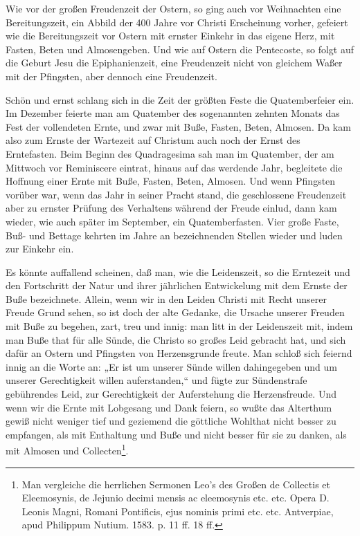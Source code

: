 Wie vor der großen Freudenzeit der Ostern, so ging auch vor Weihnachten eine Bereitungszeit, ein Abbild der 400 Jahre vor Christi Erscheinung vorher, gefeiert wie die Bereitungszeit vor Ostern mit ernster Einkehr in das eigene Herz, mit Fasten, Beten und Almosengeben. Und wie auf Ostern die Pentecoste, so folgt auf die Geburt Jesu die Epiphanienzeit, eine Freudenzeit nicht von gleichem Waßer mit der Pfingsten, aber dennoch eine Freudenzeit.

Schön und ernst schlang sich in die Zeit der größten Feste die Quatemberfeier ein. Im Dezember feierte man am Quatember des sogenannten zehnten Monats das Fest der vollendeten Ernte, und zwar mit Buße, Fasten, Beten, Almosen. Da kam also zum Ernste der Wartezeit auf Christum auch noch der Ernst des Erntefasten. Beim Beginn des Quadragesima sah man im Quatember, der am Mittwoch vor Reminiscere eintrat, hinaus auf das werdende Jahr, begleitete die Hoffnung einer Ernte mit Buße, Fasten, Beten, Almosen. Und wenn Pfingsten vorüber war, wenn das
Jahr in seiner Pracht stand, die geschlossene Freudenzeit aber zu ernster Prüfung des Verhaltens während der Freude einlud, dann kam wieder, wie auch später im September, ein Quatemberfasten. Vier große Faste, Buß- und Bettage kehrten im Jahre an bezeichnenden Stellen wieder und luden zur Einkehr ein.

Es könnte auffallend scheinen, daß man, wie die Leidenszeit, so die Erntezeit und den Fortschritt der Natur und ihrer jährlichen Entwickelung mit dem Ernste der Buße bezeichnete. Allein, wenn wir in den Leiden Christi mit Recht unserer Freude Grund sehen, so ist doch der alte Gedanke, die Ursache unserer Freuden mit Buße zu begehen, zart, treu und innig: man litt in der Leidenszeit mit, indem man Buße that für alle Sünde, die Christo so großes Leid gebracht hat, und sich dafür an Ostern und Pfingsten von Herzensgrunde freute. Man schloß sich feiernd innig an die Worte an: „Er ist um unserer Sünde willen dahingegeben und um unserer Gerechtigkeit willen auferstanden,“ und fügte zur Sündenstrafe gebührendes Leid, zur Gerechtigkeit der Auferstehung die Herzensfreude. Und wenn wir die Ernte mit Lobgesang und Dank feiern, so wußte das Alterthum gewiß nicht weniger tief und geziemend die göttliche Wohlthat nicht besser zu empfangen, als mit Enthaltung und Buße und nicht besser für sie zu danken, als mit Almosen und Collecten\footnote{Man vergleiche die herrlichen Sermonen Leo’s des Großen de Collectis et Eleemosynis, de Jejunio decimi mensis ac eleemosynis etc. etc. Opera D. Leonis Magni, Romani Pontificis, ejus nominis primi etc. etc. Antverpiae, apud Philippum Nutium. 1583. p. 11 ff. 18 ff.}.

